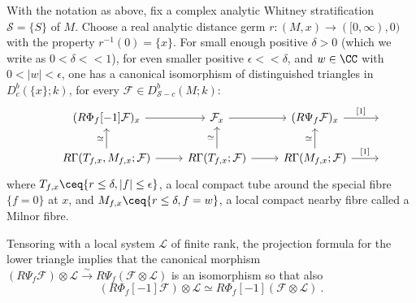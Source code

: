 \documentclass[11pt,letterpaper]{amsart}
\numberwithin{equation}{section}
\begin{document}
\begin{proposition}
\label{proposition: stalks}
    With the notation as above, fix a complex analytic Whitney stratification $\mathscr{S} = \{ S \}$ of $M$. 
    Choose a real analytic distance germ $r: (M,x) \to ([0,\infty),0)$ with the property $r^{-1}(0) = \{ x \}$.
    For small enough positive $\delta > 0$ (which we write as $0<\delta <<1$), for even smaller positive $\epsilon << \delta$, and $w\in \CC$ with $0< |w| < \epsilon$, one has a canonical isomorphism of distinguished triangles in $D^b_c(\{x\};k)$, for every $\mathcal{F} \in D^b_{\mathscr{S}-c}(M;k)$:
    \begin{equation}\label{diagram: stalks}
    \begin{tikzcd}
    & (R\Phi_f[-1]\mathcal{F})_x \arrow{r} & \mathcal{F}_x \arrow{r} & (R\Psi_f\mathcal{F})_x \arrow {r}{[1]} & \ \\
    & 
    \arrow{u}{\simeq} R\Gamma(T_{f,x}, M_{f,x};\mathcal{F}) \arrow{r} & \arrow{u}{\simeq}
    R\Gamma(T_{f,x};\mathcal{F}) \arrow{r}& \arrow{u}{\simeq}
    R\Gamma(M_{f,x};\mathcal{F}) \arrow{r}{[1]} & \
    \end{tikzcd}
    \end{equation}
where $T_{f,x} \ceq \{ r\leq \delta, |f| \leq \epsilon \}$, a local compact tube around the special fibre $\{ f=0\}$ at $x$, and $M_{f,x} \ceq \{ r\leq \delta, f = w \}$, a local compact nearby fibre called a Milnor fibre. 

Tensoring with a local system $\mathcal{L}$ of finite rank, the projection formula for the lower triangle implies that the canonical morphism
$(R\Psi_f\mathcal{F})\otimes \mathcal{L} 
\stackrel{\sim}{\to} R\Psi_f(\mathcal{F}\otimes \mathcal{L})$ is an isomorphism so that also
\begin{equation}\label{diagram: tensor-phi}
(R\Phi_f[-1]\mathcal{F})\otimes \mathcal{L} \simeq R\Phi_f[-1](\mathcal{F}\otimes \mathcal{L})\:.
\end{equation}
\end{proposition}
\end{document}
